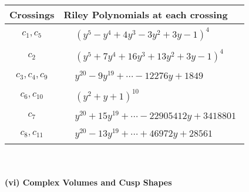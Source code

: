 \documentclass[1p]{elsarticle_modified}
\theoremstyle{definition}
\begin{document}
\begin{tabular}{m{50pt}|m{274pt}}
Crossings & \hspace{64pt}Riley Polynomials at each crossing \\
\hline $$\begin{aligned}c_{1},c_{5}\end{aligned}$$&$\begin{aligned}
&(y^5- y^4+4 y^3-3 y^2+3 y-1)^4
\end{aligned}$\\
\hline $$\begin{aligned}c_{2}\end{aligned}$$&$\begin{aligned}
&(y^5+7 y^4+16 y^3+13 y^2+3 y-1)^4
\end{aligned}$\\
\hline $$\begin{aligned}c_{3},c_{4},c_{9}\end{aligned}$$&$\begin{aligned}
&y^{20}-9 y^{19}+\cdots-12276 y+1849
\end{aligned}$\\
\hline $$\begin{aligned}c_{6},c_{10}\end{aligned}$$&$\begin{aligned}
&(y^2+y+1)^{10}
\end{aligned}$\\
\hline $$\begin{aligned}c_{7}\end{aligned}$$&$\begin{aligned}
&y^{20}+15 y^{19}+\cdots-22905412 y+3418801
\end{aligned}$\\
\hline $$\begin{aligned}c_{8},c_{11}\end{aligned}$$&$\begin{aligned}
&y^{20}-13 y^{19}+\cdots+46972 y+28561
\end{aligned}$\\
\hline
\end{tabular}\\~\\
\newpage\flushleft \textbf{(vi) Complex Volumes and Cusp Shapes}
\end{document}
